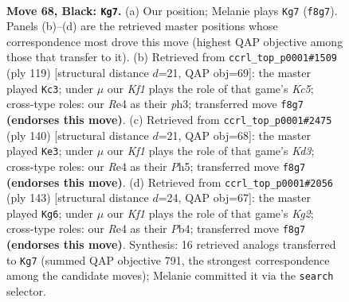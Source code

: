 \documentclass[11pt]{article}
\begin{document}
\clearpage

\begin{figure}[p]\centering
\begin{subfigure}{0.46\textwidth}\centering
\resizebox{\linewidth}{!}{%
\newchessgame
\chessboard[
  setfen={3Q1k2/8/5p1q/3p4/4r3/6P1/6KP/8 b - - 17 68},
  showmover=false,
  pgfstyle=straightmove, color=movearrow, markmove={f8-g7}
]}
\caption{}
\end{subfigure}\hfill
\begin{subfigure}{0.46\textwidth}\centering
\resizebox{\linewidth}{!}{%
\newchessgame
\chessboard[
  setfen={8/8/8/8/2k5/1q5P/p3QPPK/8 b - - 5 60},
  showmover=false,
  pgfstyle=straightmove, color=movearrow, markmove={c4-c3}
]}
\caption{}
\end{subfigure}
\\[4pt]
\begin{subfigure}{0.46\textwidth}\centering
\resizebox{\linewidth}{!}{%
\newchessgame
\chessboard[
  setfen={7k/1P1p2p1/8/1q5P/4Q3/3K4/8/8 w - - 3 71},
  showmover=false,
  pgfstyle=straightmove, color=movearrow, markmove={d3-e3}
]}
\caption{}
\end{subfigure}\hfill
\begin{subfigure}{0.46\textwidth}\centering
\resizebox{\linewidth}{!}{%
\newchessgame
\chessboard[
  setfen={8/4Q1k1/8/5qp1/Pp6/1P1p3P/6P1/7K b - - 9 72},
  showmover=false,
  pgfstyle=straightmove, color=movearrow, markmove={g7-g6}
]}
\caption{}
\end{subfigure}
\caption{\textbf{Move 68, Black: \texttt{Kg7}.} (a) Our position; Melanie plays \texttt{Kg7} (\texttt{f8g7}). Panels (b)--(d) are the retrieved master positions whose correspondence most drove this move (highest QAP objective among those that transfer to it). (b) Retrieved from \texttt{ccrl\_top\_p0001\#1509} (ply 119) [structural distance $d$=21, QAP obj=69]: the master played \texttt{Kc3}; under $\mu$ our \emph{Kf1} plays the role of that game's \emph{Kc5}; cross-type roles: our \emph{R}e4 as their \emph{p}h3; transferred move \texttt{f8g7} \textbf{(endorses this move)}. (c) Retrieved from \texttt{ccrl\_top\_p0001\#2475} (ply 140) [structural distance $d$=21, QAP obj=68]: the master played \texttt{Ke3}; under $\mu$ our \emph{Kf1} plays the role of that game's \emph{Kd3}; cross-type roles: our \emph{R}e4 as their \emph{P}h5; transferred move \texttt{f8g7} \textbf{(endorses this move)}. (d) Retrieved from \texttt{ccrl\_top\_p0001\#2056} (ply 143) [structural distance $d$=24, QAP obj=67]: the master played \texttt{Kg6}; under $\mu$ our \emph{Kf1} plays the role of that game's \emph{Kg2}; cross-type roles: our \emph{R}e4 as their \emph{P}b4; transferred move \texttt{f8g7} \textbf{(endorses this move)}. Synthesis: 16 retrieved analogs transferred to \texttt{Kg7} (summed QAP objective 791, the strongest correspondence among the candidate moves); Melanie committed it via the \texttt{search} selector.}
\label{fig:thought-m135}
\end{figure}
\end{document}
